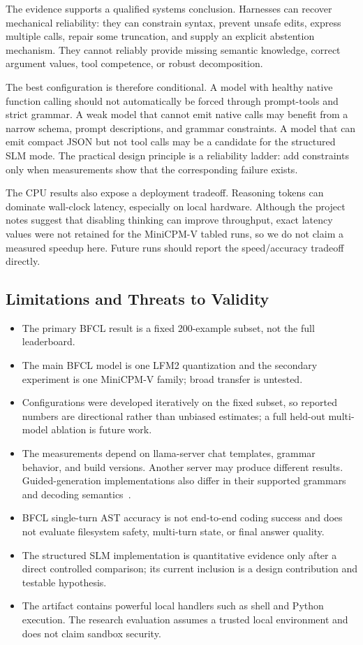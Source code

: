 \documentclass[conference]{IEEEtran}
\begin{document}
The evidence supports a qualified systems conclusion. Harnesses can recover mechanical
reliability: they can constrain syntax, prevent unsafe edits, express multiple calls, repair
some truncation, and supply an explicit abstention mechanism. They cannot reliably provide
missing semantic knowledge, correct argument values, tool competence, or robust decomposition.

The best configuration is therefore conditional. A model with healthy native function calling
should not automatically be forced through prompt-tools and strict grammar. A weak model that
cannot emit native calls may benefit from a narrow schema, prompt descriptions, and grammar
constraints. A model that can emit compact JSON but not tool calls may be a candidate for the
structured SLM mode. The practical design principle is a reliability ladder: add constraints
only when measurements show that the corresponding failure exists.

The CPU results also expose a deployment tradeoff. Reasoning tokens can dominate wall-clock
latency, especially on local hardware. Although the project notes suggest that disabling
thinking can improve throughput, exact latency values were not retained for the MiniCPM-V
tabled runs, so we do not claim a measured speedup here. Future runs should report the
speed/accuracy tradeoff directly.

\subsection{Limitations and Threats to Validity}

\begin{itemize}
\item The primary BFCL result is a fixed 200-example subset, not the full leaderboard.
\item The main BFCL model is one LFM2 quantization and the secondary experiment is one
MiniCPM-V family; broad transfer is untested.
\item Configurations were developed iteratively on the fixed subset, so reported numbers are
directional rather than unbiased estimates; a full held-out multi-model ablation is future work.
\item The measurements depend on llama-server chat templates, grammar behavior, and build
versions. Another server may produce different results. Guided-generation implementations
also differ in their supported grammars and decoding semantics~\cite{willard2023guiding}.
\item BFCL single-turn AST accuracy is not end-to-end coding success and does not evaluate
filesystem safety, multi-turn state, or final answer quality.
\item The structured SLM implementation is quantitative evidence only after a direct controlled
comparison; its current inclusion is a design contribution and testable hypothesis.
\item The artifact contains powerful local handlers such as shell and Python execution. The
research evaluation assumes a trusted local environment and does not claim sandbox security.
\end{itemize}
\end{document}
